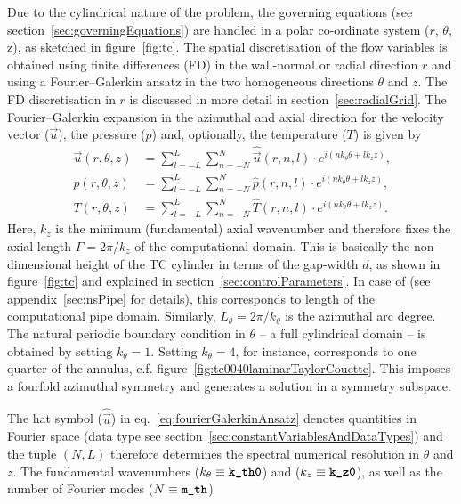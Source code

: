 \documentclass[a4paper, 11pt, DIV=11]{scrartcl}
\begin{document}
Due to the cylindrical nature of the problem, the governing equations (see
section~\ref{sec:governingEquations}) are handled in a polar co-ordinate
system ($r$, $\theta$, z), as sketched in figure~\ref{fig:tc}. The spatial
discretisation of the flow variables is obtained using finite differences
(FD) in the wall-normal or radial direction $r$ and using a Fourier--Galerkin
ansatz in the two homogeneous directions $\theta$ and $z$. The FD
discretisation in $r$ is discussed in more detail in section~\ref{sec:radialGrid}.
The Fourier--Galerkin expansion in the azimuthal and axial direction for
the velocity vector ($\vec{u}$), the pressure ($p$) and, optionally, the
temperature ($T$) is given by
\begin{align}
\vec{u}(r,\theta,z) & =
\sum_{l=-L}^{L}\sum_{n=-N}^{N}\hat{\vec{u}}(r,n,l)\cdot e^{i\left(n k_{\theta}\theta+l k_{z} z\right)}
\text{,}\\
p(r,\theta,z) &
=\sum_{l=-L}^{L}\sum_{n=-N}^{N}\hat{p}(r,n,l)\cdot e^{i\left(n k_{\theta}\theta+l k_{z} z\right)}
\text{,}\\
T(r,\theta,z) &
=\sum_{l=-L}^{L}\sum_{n=-N}^{N}\hat{T}(r,n,l)\cdot e^{i\left(n k_{\theta}\theta+l k_{z} z\right)}
\text{.}
\label{eq:fourierGalerkinAnsatz}
\end{align}
Here, $k_z$ is the minimum (fundamental) axial wavenumber and therefore fixes
the axial length $\Gamma=2\pi/k_z$ of the computational domain. This is basically
the non-dimensional height of the TC cylinder in terms of the gap-width $d$, as
shown in figure~\ref{fig:tc} and explained in section~\ref{sec:controlParameters}.
In case of \nsp (see appendix~\ref{sec:nsPipe} for details), this corresponds to
length of the computational pipe domain. Similarly, $L_\theta=2\pi/k_\theta$ is
the azimuthal arc degree. The natural periodic boundary condition in $\theta$ --
\ie a full cylindrical domain -- is obtained by setting $k_{\theta}=1$. Setting
$k_\theta=4$, for instance, corresponds to one quarter of the annulus, c.f.
figure~\ref{fig:tc0040laminarTaylorCouette}. This imposes a fourfold azimuthal
symmetry and generates a solution in a symmetry subspace.
\par
The hat symbol (\eg $\hat{\vec{u}}$) in eq.~\eqref{eq:fourierGalerkinAnsatz} denotes
quantities in Fourier space (data type see section~\ref{sec:constantVariablesAndDataTypes})
and the tuple $(N, L)$ therefore determines the spectral numerical resolution in $\theta$
and $z$. The fundamental wavenumbers ($k_{\theta}\equiv\textbf{\texttt{\color{black}k\_th0}}$) and
($k_{z}\equiv\textbf{\texttt{\color{black}k\_z0}}$), as well as the number of Fourier modes ($N\equiv\textbf{\texttt{\color{black}m\_{th}}}$)
\end{document}
